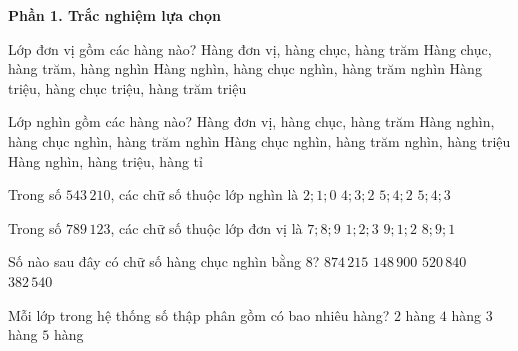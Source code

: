 \textbf{Phần 1. Trắc nghiệm lựa chọn}

\begin{ex} %
Lớp đơn vị gồm các hàng nào?
\choice
{\True Hàng đơn vị, hàng chục, hàng trăm}
{Hàng chục, hàng trăm, hàng nghìn}
{Hàng nghìn, hàng chục nghìn, hàng trăm nghìn}
{Hàng triệu, hàng chục triệu, hàng trăm triệu}
\end{ex}

\begin{ex} %
Lớp nghìn gồm các hàng nào?
\choice
{Hàng đơn vị, hàng chục, hàng trăm}
{\True Hàng nghìn, hàng chục nghìn, hàng trăm nghìn}
{Hàng chục nghìn, hàng trăm nghìn, hàng triệu}
{Hàng nghìn, hàng triệu, hàng tỉ}
\end{ex}

\begin{ex} %
Trong số $543\,210$, các chữ số thuộc lớp nghìn là
\choice
{$2; 1; 0$}
{$4; 3; 2$}
{$5; 4; 2$}
{\True $5; 4; 3$}
\end{ex}

\begin{ex} %
Trong số $789\,123$, các chữ số thuộc lớp đơn vị là
\choice
{$7; 8; 9$}
{\True $1; 2; 3$}
{$9; 1; 2$}
{$8; 9; 1$}
\end{ex}

\begin{ex} %
Số nào sau đây có chữ số hàng chục nghìn bằng 8?
\choice
{$874\,215$}
{$148\,900$}
{$520\,840$}
{\True $382\,540$}
\end{ex}

\begin{ex} %
Mỗi lớp trong hệ thống số thập phân gồm có bao nhiêu hàng?
\choice
{$2$ hàng}
{$4$ hàng}
{\True $3$ hàng}
{$5$ hàng}
\end{ex}

